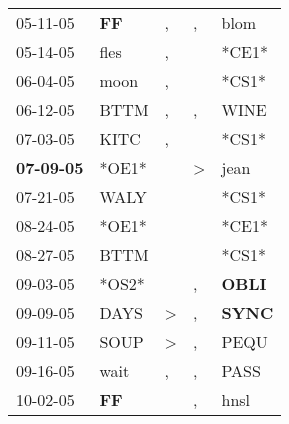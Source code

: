 \begin{supertabular}{p{0.07\textwidth}p{0.06\textwidth}p{0.02\textwidth}p{0.02\textwidth}p{0.06\textwidth}}
          05-11-05\textsuperscript{} &    \textbf{FF\textsuperscript{}} &                , &                , &           blom\textsuperscript{} \\
          05-14-05\textsuperscript{} &           fles\textsuperscript{} &                , &                  &                            *CE1* \\
          06-04-05\textsuperscript{} &           moon\textsuperscript{} &                , &                  &                            *CS1* \\
          06-12-05\textsuperscript{} &           BTTM\textsuperscript{} &                , &                , &           WINE\textsuperscript{} \\
          07-03-05\textsuperscript{} &           KITC\textsuperscript{} &                , &                  &                            *CS1* \\
 \textbf{07-09-05\textsuperscript{}} &                            *OE1* &                  &     \textgreater &           jean\textsuperscript{} \\
          07-21-05\textsuperscript{} &           WALY\textsuperscript{} &                  &                  &                            *CS1* \\
          08-24-05\textsuperscript{} &                            *OE1* &                  &                  &                            *CE1* \\
          08-27-05\textsuperscript{} &           BTTM\textsuperscript{} &                  &                  &                            *CS1* \\
          09-03-05\textsuperscript{} &                            *OS2* &                  &                , &  \textbf{OBLI\textsuperscript{}} \\
          09-09-05\textsuperscript{} &           DAYS\textsuperscript{} &     \textgreater &                , &  \textbf{SYNC\textsuperscript{}} \\
          09-11-05\textsuperscript{} &           SOUP\textsuperscript{} &     \textgreater &                , &           PEQU\textsuperscript{} \\
          09-16-05\textsuperscript{} &           wait\textsuperscript{} &                , &                , &           PASS\textsuperscript{} \\
          10-02-05\textsuperscript{} &    \textbf{FF\textsuperscript{}} &                  &                , &           hnsl\textsuperscript{} \\

\end{supertabular}
